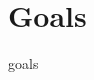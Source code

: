 \documentclass[12pt,a4paper]{report}
\begin{document}








\section*{Goals}

{goals}





\end{document}
